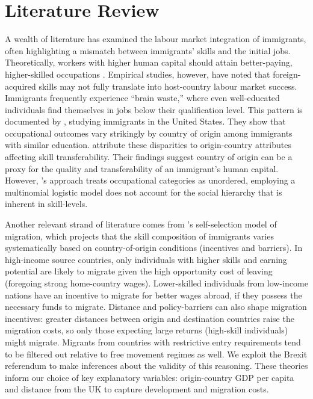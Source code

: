 \documentclass[12pt, a4paper]{article}
\begin{document}
\section{Literature Review} \label{sec:lit}
A wealth of literature has examined the labour market integration of immigrants, often highlighting a mismatch between immigrants’ skills and the initial jobs. Theoretically, workers with higher human capital should attain better-paying, higher-skilled occupations \citep{BeckerHumanCap}. Empirical studies, however, have noted that foreign-acquired skills may not fully translate into host-country labour market success. Immigrants frequently experience “brain waste,” where even well-educated individuals find themselves in jobs below their qualification level. This pattern is documented by \citet{MattooBrainWaste}, studying immigrants in the United States. They show that occupational outcomes vary strikingly by country of origin among immigrants with similar education. \citet{MattooBrainWaste} attribute these disparities to origin-country attributes affecting skill transferability. Their findings suggest country of origin can be a proxy for the quality and transferability of an immigrant’s human capital. However, \citet{MattooBrainWaste}'s approach treats occupational categories as unordered, employing a multinomial logistic model does not account for the social hierarchy that is inherent in skill-levels. 

Another relevant strand of literature comes from \citet{BorjasSelfSelection}'s self-selection model of migration, which projects that the skill composition of immigrants varies systematically based on country-of-origin conditions (incentives and barriers). In high-income source countries, only individuals with higher skills and earning potential are likely to migrate given the high opportunity cost of leaving (foregoing strong home-country wages). Lower-skilled individuals from low-income nations have an incentive to migrate for better wages abroad, if they possess the necessary funds to migrate. Distance and policy-barriers can also shape migration incentives: greater distances between origin and destination countries raise the migration costs, so only those expecting large returns (high-skill individuals) might migrate. Migrants from countries with restrictive entry requirements tend to be filtered out relative to free movement regimes as well. We exploit the Brexit referendum to make inferences about the validity of this reasoning. These theories inform our choice of key explanatory variables: origin-country GDP per capita and distance from the UK to capture development and migration costs.
\end{document}
